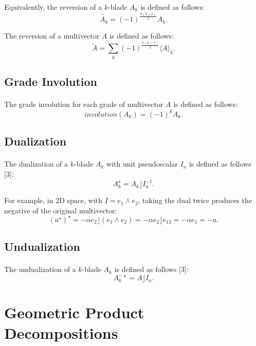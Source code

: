 \documentclass{article}
\begin{document}
Equivalently, the reversion of a $k$-blade $A_k$ is defined as follows:
$$\tilde{A_k} = (-1)^{\frac{k(k-1)}{2}} A_k.$$

The reversion of a multivector $A$ is defined as follows:
$$\tilde{A} = \sum_{k}^{} (-1)^{\frac{k(k-1)}{2}} \langle A \rangle_k .$$

\subsection{\textbf{Grade Involution}}

\paragraph{}The grade involution for each grade of multivector $A$ is defined as follows:
$$involution(A_k) = (-1)^{k} A_k .$$

\subsection{\textbf{Dualization}}

\paragraph{}The dualization of a $k$-blade $A_k$ with unit pseudoscalar $I_n$ is defined as follows [3]:
$$A_k^{\star} = {A_k} \rfloor I_n^{-1}.$$

For example, in 2D space, with $I = e_1 \wedge e_2$, taking the dual twice produces the negative of the original multivector:
$$(a^\star)^\star = -\alpha e_2 \rfloor (e_1 \wedge e_2) = -\alpha e_2 \rfloor e_{12} = -\alpha e_1 = -a.$$

\subsection{\textbf{Undualization}}

\paragraph{}The undualization of a $k$-blade $A_k$ is defined as follows [3]:
$$A_k^{-\star} = A \rfloor I_n.$$

\section{Geometric Product Decompositions}
\end{document}
